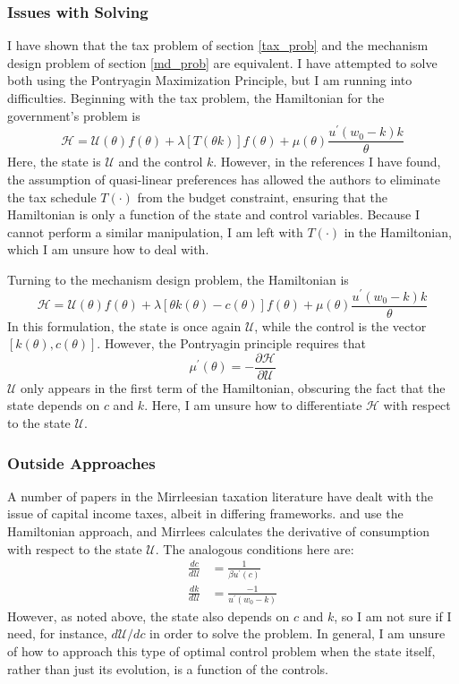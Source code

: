 \documentclass[11pt]{article}
\newcommand{\p}{\prime}
\newcommand{\U}{\mathcal{U}}
\renewcommand{\H}{\mathcal{H}}
\newcommand{\pderiv}[2]{\frac{\partial#1}{\partial #2}}
\begin{document}
\subsubsection{Issues with Solving}
I have shown that the tax problem of section \ref{tax_prob} and the mechanism design problem of section \ref{md_prob} are equivalent. I have attempted to solve both using the Pontryagin Maximization Principle, but I am running into difficulties. Beginning with the tax problem, the Hamiltonian for the government's problem is 
\begin{equation}
    \H = \U(\theta)f(\theta) + \lambda\left[ T(\theta k) \right]f(\theta) + \mu(\theta)\frac{u^\p(w_0 - k)k}{\theta} \label{ham_tax}
\end{equation}
Here, the state is \( \U \) and the control \( k \). However, in the references I have found, the assumption of quasi-linear preferences has allowed the authors to eliminate the tax schedule \( T(\cdot) \) from the budget constraint, ensuring that the Hamiltonian is only a function of the state and control variables. Because I cannot perform a similar manipulation, I am left with \( T(\cdot) \) in the Hamiltonian, which I am unsure how to deal with. 

Turning to the mechanism design problem, the Hamiltonian is 
\begin{equation}
    \H = \U(\theta)f(\theta) + \lambda\left[ \theta k(\theta) - c(\theta) \right]f(\theta) + \mu(\theta)\frac{u^\p(w_0 - k)k}{\theta} \label{ham_md}
\end{equation}
In this formulation, the state is once again \( \U \), while the control is the vector \( \left[ k(\theta), c(\theta) \right] \). However, the Pontryagin principle requires that 
\begin{equation*}
    \mu^\p(\theta) = -\pderiv{\H}{\U}
\end{equation*}
\( \U \) only appears in the first term of the Hamiltonian, obscuring the fact that the state depends on \( c \) and \( k \). Here, I am unsure how to differentiate \( \H \) with respect to the state \( \U \). 

\subsubsection{Outside Approaches}
A number of papers in the Mirrleesian taxation literature have dealt with the issue of capital income taxes, albeit in differing frameworks. \cite{mirrlees1971exploration} and \cite{diamond1998optimal} use the Hamiltonian approach, and Mirrlees calculates the derivative of consumption with respect to the state \( \U \). The analogous conditions here are:
\begin{align}
    \frac{dc}{d\U} &= \frac{1}{\beta u^\p(c)} \\
    \frac{dk}{d\U} &= \frac{-1}{u^\p(w_0 - k)}
\end{align}
However, as noted above, the state also depends on \( c \) and \( k \), so I am not sure if I need, for instance, \( d\U/dc \) in order to solve the problem. In general, I am unsure of how to approach this type of optimal control problem when the state itself, rather than just its evolution, is a function of the controls.  
\end{document}
